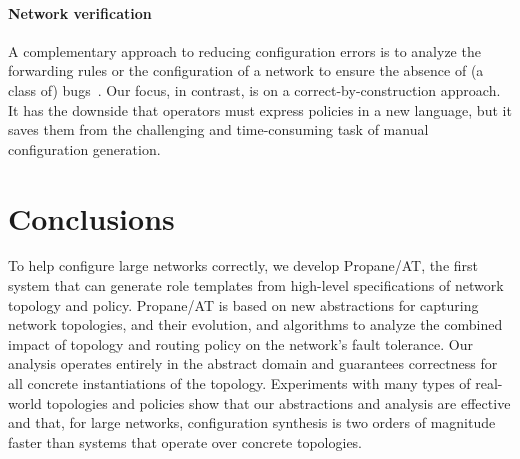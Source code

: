\documentclass[numbers, 10pt]{sigplanconf}
\newcommand{\sysname}{{\text{}\small \sf Propane/AT}\xspace}
\newcommand{\para}[1]{\paragraph*{\textbf{#1}}}
\begin{document}
\para{Network verification}
A complementary approach to reducing configuration errors is to analyze the forwarding rules or the configuration of a network to ensure the absence of (a class of) bugs~\cite{anteater,hsa,veriflow,feamster+:rcc,ipassure,batfish,bagpipe,arc,era,surgery,coalgebraic}. Our focus, in contrast, is on a correct-by-construction approach. It has the downside that operators must express policies in a new language, but it saves them from the challenging and time-consuming task of manual configuration generation.




%
%
%
%

\section{Conclusions}
\label{sec:conclusions}

To help configure large networks correctly, we develop \sysname, the first system that can generate role templates from high-level specifications of network topology and policy. \sysname is based on new abstractions for capturing network topologies, and their evolution, and algorithms to analyze the combined impact of topology and routing policy on the network's fault tolerance. Our analysis operates entirely in the abstract domain and guarantees correctness for all concrete instantiations of the topology. Experiments with many types of real-world topologies and policies show that our abstractions and analysis are effective and that, for large networks, configuration synthesis is two orders of magnitude faster than systems that operate over concrete topologies.
\end{document}
